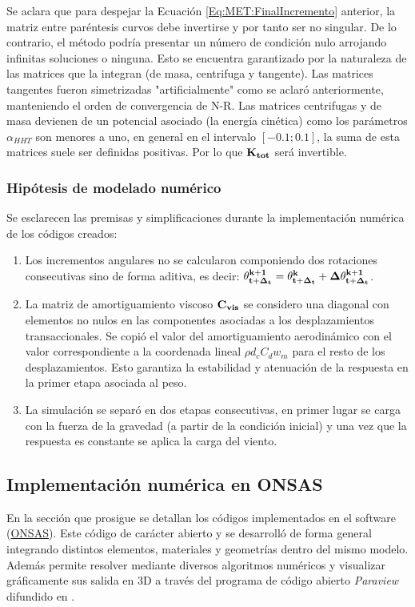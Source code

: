 Se aclara que para despejar la Ecuación \eqref{Eq:MET:FinalIncremento} anterior, la matriz entre paréntesis curvos debe invertirse y por tanto ser no singular. De lo contrario, el método podría presentar un número de condición nulo arrojando infinitas soluciones o ninguna.  Esto se encuentra garantizado por la naturaleza de las matrices que la integran (de masa, centrifuga y tangente). Las matrices tangentes fueron simetrizadas "artificialmente" como se aclaró anteriormente, manteniendo el orden de convergencia de N-R. Las matrices centrifugas y de masa devienen de un potencial asociado (la energía cinética) como los parámetros $\alpha_{HHT}$ son menores a uno, en general en el intervalo $[-0.1;0.1]$, la suma de esta matrices suele ser definidas positivas. Por lo que $\bf{K}_{tot}$ será invertible.

\subsubsection{Hipótesis de modelado numérico}\label{Sec:MET:HipotesisModeladoNumerico}
Se esclarecen las premisas y simplificaciones durante la implementación numérica de los códigos creados: 
\begin{enumerate}
\item Los incrementos angulares no se calcularon componiendo dos rotaciones consecutivas sino de forma aditiva, es decir: $\bf{\theta_{t+\Delta_t}^{k+1}}=\bf{\theta_{t+\Delta_t}^{k}}+\bf{\Delta \theta_{t+\Delta_t}^{k+1}}$.
\item La matriz de amortiguamiento viscoso $\bf{C}_{vis}$ se considero una diagonal con elementos no nulos en las componentes asociadas a los desplazamientos transaccionales. Se copió el valor del amortiguamiento aerodinámico  con el valor correspondiente a la coordenada lineal $\rho d_c C_d w_m$ para el resto de los desplazamientos. Esto garantiza la estabilidad y atenuación de la respuesta en la primer etapa asociada al peso.
\item La simulación se separó en dos etapas consecutivas, en primer lugar se carga con la fuerza de la gravedad (a partir de la condición inicial) y una vez que la respuesta es constante se aplica la carga del viento. 
\end{enumerate}


\subsection{Implementación numérica en ONSAS}\label{Sec:MET:ImplementNumeric}
En la sección que prosigue se detallan los códigos implementados en el software (\href{https://github.com/ONSAS/ONSAS/}{ONSAS}). Este código de carácter abierto y se desarrolló de forma general integrando distintos elementos, materiales y geometrías dentro del mismo modelo. Además permite resolver mediante diversos algoritmos numéricos y visualizar gráficamente sus salida en 3D a través del programa de código abierto \emph{Paraview} difundido en \citep{ahrens2005paraview}.

